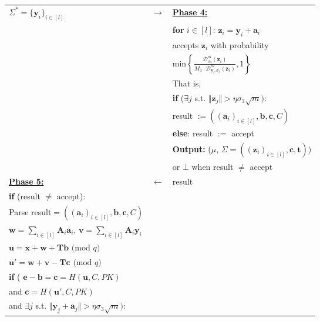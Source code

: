 \documentclass[runningheads]{llncs}
\begin{document}
\begin{itemize}
\begin{figure}[pt]
\begin{tabular}{|  l c l | }
			\hline
			\hspace{5cm} $\Sigma^*=\{\mathbf{y}_i\}_{i \in [l]} $&$\longrightarrow$&\textbf{\underline{Phase 4:}}\\
			&&	\textbf{for} { $i\in[l]$}: $\mathbf{z}_i=\mathbf{y}_i+\mathbf{a}_i$\\
			&&\hspace{0.5cm}  accepts $\mathbf{z}_i$ with probability \\
			&&\hspace{1.5cm} min$ \left\{ \frac{\mathcal{D}_{\sigma_3}^m(\mathbf{z}_i)}{M_3 \cdot \mathcal{D}^m_{\mathbf{y}_i, \sigma_3}(\mathbf{z}_i)},1 \right\}$\\
			&&That is, \\
			&&\hspace{0.5cm} \textbf{if} ($\exists j$ s.t. $\Vert \mathbf{z}_{j} \Vert >  \eta \sigma_3 \sqrt{m}):$ \\
			&&\hspace{1cm} \textsf{result} $:= ((\mathbf{a}_i)_{i\in[l]}, \mathbf{b}, \mathbf{c}, C)$\\
			&&\hspace{0.5cm} \textbf{else}: \textsf{result} $:= $ \textsf{accept}\\		
			&&\textbf{Output:} ($\mu$, $ \Sigma=((\mathbf{z}_i)_{i \in [l]}, \mathbf{c}, \mathbf{t}))$\\
			&&\hspace{0.5cm}  or $\bot$ when \textsf{result }$\neq$ \textsf{accept}\\
			
			\hline 
			\textbf{\underline{Phase 5:}}&$\longleftarrow$&\textsf{        result      }\\
			
			
			\textbf{if} (\textsf{result} $\neq$ \textsf{accept}): &&\\
			
			\hspace{0.5cm} 	Parse \textsf{result}$=((\mathbf{a}_i)_{i\in[l]}, \mathbf{b}, \mathbf{c}, C)$ &&\\
			
			\hspace{0.5cm}  $\mathbf{w}=\sum_{i \in [l]}\mathbf{A}_i\mathbf{a}_i$, $\mathbf{v}=\sum_{i \in [l]}\mathbf{A}_i\mathbf{y}_i$&&\\
			\hspace{0.5cm} $\mathbf{u}=\mathbf{x}+\mathbf{w}+\mathbf{T}\mathbf{b} \text{ (mod } q)$&&\\
			\hspace{0.5cm} $\mathbf{u}'=\mathbf{w}+\mathbf{v}-\mathbf{T}\mathbf{c} \text{ (mod } q)$&&\\
			\hspace{0.5cm} \textbf{if} ( $\mathbf{e}-\mathbf{b}=\mathbf{c}=H(\mathbf{u}, C, PK)$ &&\\
			\hspace{1cm}  and $\mathbf{c}=H(\mathbf{u}', C, PK)$ &&\\
			\hspace{1cm}  and $\exists j$ s.t. $\Vert \mathbf{y}_{j}+\mathbf{a}_{j} \Vert >  \eta \sigma_3 \sqrt{m}):$ &&\\
			

\end{tabular}
\end{figure}
\end{itemize}
\end{document}
